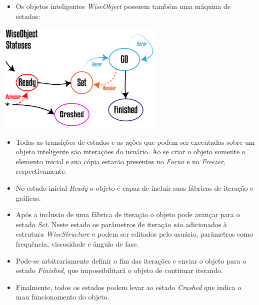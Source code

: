\documentclass[10pt,aspectratio=169]{beamer}
\theoremstyle{remark}
\theoremstyle{definition}
\begin{document}
\begin{frame}[allowframebreaks]
	\framebreak

	\begin{itemize}
			\item Os objetos inteligentes \textit{WiseObject} possuem também uma máquina de estados:
	\end{itemize}		
	
	\begin{center}
		
		\item \includegraphics[width=0.6\textwidth]{Figures/WiseObjectStatus@16x.png}
		
	\end{center}
	
	\framebreak
	
	\begin{itemize}
		\item Todas as transições de estados e as ações que podem ser executadas sobre um objeto inteligente são interações do usuário. Ao se criar o objeto somente o elemento inicial e sua cópia estarão presentes no \textit{Forno} e no \textit{Freezer}, respectivamente.
		\item No estado inicial \textit{Ready} o objeto é capaz de incluir suas fábricas de iteração e gráficas.
		\item Após a inclusão de uma fábrica de iteração o objeto pode avançar para o estado \textit{Set}. Neste estado os parâmetros de iteração são adicionados à estrutura \textit{WiseStructure} e podem ser editados pelo usuário, parâmetros como frequência, viscosidade e ângulo de fase.
		\item Pode-se arbitrariamente definir o fim das iterações e enviar o objeto para o estado \textit{Finished}, que impossibilitará o objeto de continuar iterando.
		\item Finalmente, todos os estados podem levar ao estado \textit{Crashed} que indica o mau funcionamento do objeto.
	\end{itemize}
	
	\framebreak
	

\end{frame}
\end{document}
